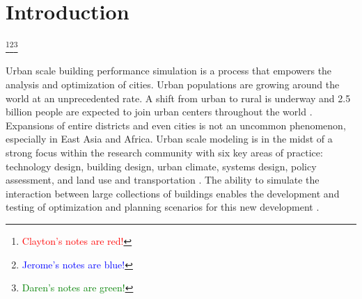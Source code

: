\documentclass{tBPS2e}
\theoremstyle{plain}
\theoremstyle{definition}
\theoremstyle{remark}
\newcommand{\noteCM}[1]{\footnote{\textcolor{red}{#1}}}
\newcommand{\noteJK}[1]{\footnote{\textcolor{blue}{#1}}}
\newcommand{\noteDT}[1]{\footnote{\textcolor{green}{#1}}}
\begin{document}

\linenumbers

\section{Introduction}\noteCM{Clayton's notes are red!}\noteJK{Jerome's notes are blue!}\noteDT{Daren's notes are green!}

Urban scale building performance simulation is a process that empowers the analysis and optimization of cities. Urban populations are growing around the world at an unprecedented rate. A shift from urban to rural is underway and 2.5 billion people are expected to join urban centers throughout the world \citep{UnitedNations:2014vn}. Expansions of entire districts and even cities is not an uncommon phenomenon, especially in East Asia and Africa. Urban scale modeling is in the midst of a strong focus within the research community with six key areas of practice: technology design, building design, urban climate, systems design, policy assessment, and land use and transportation \citep{Keirstead:2012ct}. The ability to simulate the interaction between large collections of buildings enables the development and testing of optimization and planning scenarios for this new development \citep{Dorer:2013vt}. 
\end{document}
